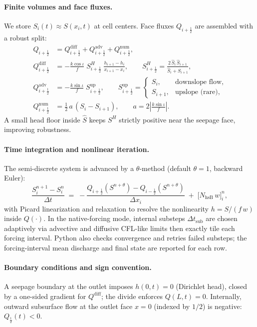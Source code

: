 \documentclass[12pt]{article}
\begin{document}
\paragraph{Finite volumes and face fluxes.}
We store $S_i(t)\approx S(x_i,t)$ at cell centers. Face fluxes $Q_{i+\frac12}$ are assembled with a robust split:
\begin{align}
Q_{i+\frac12}
&= Q^{\text{diff}}_{i+\frac12} + Q^{\text{adv}}_{i+\frac12} + Q^{\text{num}}_{i+\frac12}, \\
Q^{\text{diff}}_{i+\frac12}
&= -\frac{k\cos\iota}{f}\;S^{H}_{i+\frac12}\;\frac{h_{i+1}-h_i}{x_{i+1}-x_i},\qquad
S^{H}_{i+\frac12}=\frac{2\,\widehat S_i\,\widehat S_{i+1}}{\widehat S_i+\widehat S_{i+1}},\\
Q^{\text{adv}}_{i+\frac12}
&= -\frac{k\sin\iota}{f}\;S^{\text{up}}_{i+\frac12},\qquad
S^{\text{up}}_{i+\frac12}=\begin{cases} S_i, & \text{downslope flow},\\ S_{i+1}, & \text{upslope (rare)},\end{cases}\\
Q^{\text{num}}_{i+\frac12}
&= \tfrac12\,a\,(S_i-S_{i+1}),\qquad a=2\left|\frac{k\sin\iota}{f}\right|.
\end{align}
A small head floor inside $\widehat S$ keeps $S^{H}$ strictly positive near the seepage face, improving robustness.

\paragraph{Time integration and nonlinear iteration.}
The semi-discrete system is advanced by a $\theta$-method (default $\theta=1$, backward Euler):
\begin{equation}
\frac{S^{n+1}_i-S^n_i}{\Delta t}
\;=\;
-\frac{Q_{i+\frac12}(S^{n+\theta})-Q_{i-\frac12}(S^{n+\theta})}{\Delta x_i}
\;+\; \bigl[N_{\text{hsB}}\,w\bigr]^n_i,
\label{eq:hsb-theta}
\end{equation}
with Picard linearization and relaxation to resolve the nonlinearity $h=S/(f\,w)$ inside $Q(\cdot)$. In the native-forcing mode, internal substeps $\Delta t_{\text{sub}}$ are chosen adaptively via advective and diffusive CFL-like limits then exactly tile each forcing interval. Python also checks convergence and retries failed substeps; the forcing-interval mean discharge and final state are reported for each row.

\paragraph{Boundary conditions and sign convention.}
A seepage boundary at the outlet imposes $h(0,t)=0$ (Dirichlet head), closed by a one-sided gradient for $Q^{\text{diff}}$; the divide enforces $Q(L,t)=0$. Internally, outward subsurface flow at the outlet face $x=0$ (indexed by $1/2$) is negative: $Q_{\frac12}(t)<0$.
\end{document}
